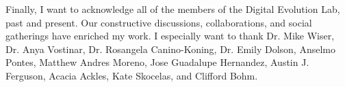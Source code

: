 Finally, I want to acknowledge all of the members of the Digital Evolution Lab, past and present.
Our constructive discussions, collaborations, and social gatherings have enriched my work.
I especially want to thank
Dr. Mike Wiser,
Dr. Anya Vostinar,
Dr. Rosangela Canino-Koning,
Dr. Emily Dolson,
Anselmo Pontes,
Matthew Andres Moreno,
Jose Guadalupe Hernandez,
Austin J. Ferguson,
Acacia Ackles,
Kate Skocelas,
and Clifford Bohm.







